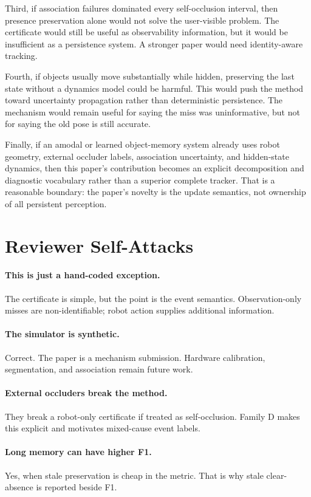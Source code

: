 \documentclass{article}
\begin{document}
Third, if association failures dominated every self-occlusion interval, then
presence preservation alone would not solve the user-visible problem. The
certificate would still be useful as observability information, but it would be
insufficient as a persistence system. A stronger paper would need identity-aware
tracking.

Fourth, if objects usually move substantially while hidden, preserving the last
state without a dynamics model could be harmful. This would push the method
toward uncertainty propagation rather than deterministic persistence. The
mechanism would remain useful for saying the miss was uninformative, but not for
saying the old pose is still accurate.

Finally, if an amodal or learned object-memory system already uses robot
geometry, external occluder labels, association uncertainty, and hidden-state
dynamics, then this paper's contribution becomes an explicit decomposition and
diagnostic vocabulary rather than a superior complete tracker. That is a
reasonable boundary: the paper's novelty is the update semantics, not ownership
of all persistent perception.

\section{Reviewer Self-Attacks}

\paragraph{This is just a hand-coded exception.}
The certificate is simple, but the point is the event semantics. Observation-only
misses are non-identifiable; robot action supplies additional information.

\paragraph{The simulator is synthetic.}
Correct. The paper is a mechanism submission. Hardware calibration, segmentation,
and association remain future work.

\paragraph{External occluders break the method.}
They break a robot-only certificate if treated as self-occlusion. Family D makes
this explicit and motivates mixed-cause event labels.

\paragraph{Long memory can have higher F1.}
Yes, when stale preservation is cheap in the metric. That is why stale
clear-absence is reported beside F1.
\end{document}
